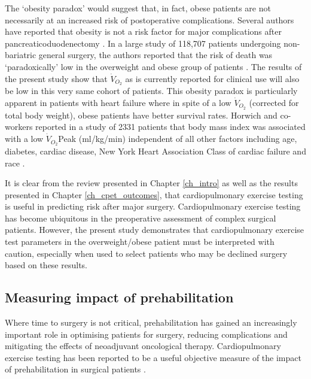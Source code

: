 The `obesity paradox' would suggest that, in fact, obese patients are not necessarily at an increased risk of postoperative complications. Several authors have reported that obesity is not a risk factor for major complications after pancreaticoduodenectomy \parencite{khan_does_2010, tsai_impact_2010, balentine_obesity_2011}. 
In a large study of 118,707 patients undergoing non-bariatric general surgery, the authors reported that the risk of death was `paradoxically' low in the overweight and obese group of patients \parencite{mullen_obesity_2009}. The results of the present study show that $\dot{V}_{O_2}$ as is currently reported for clinical use will also be low in this very same cohort of patients. 
This obesity paradox is particularly apparent in patients with heart failure where in spite of a low $\dot{V}_{O_2}$ (corrected for total body weight), obese patients have better survival rates. Horwich and co-workers reported in a study of 2331 patients that body mass index was associated with a low $\dot{V}_{O_2}$Peak (ml/kg/min) independent of all other factors including age, diabetes, cardiac disease, New York Heart Association Class of cardiac failure and race \parencite{horwich_relationship_2009}.

It is clear from the review presented in Chapter \ref{ch_intro} as well as the results presented in Chapter \ref{ch_cpet_outcomes}, that cardiopulmonary exercise testing is useful in predicting risk after major surgery. Cardiopulmonary exercise testing has become ubiquitous in the preoperative assessment of complex surgical patients. However, the present study demonstrates that cardiopulmonary exercise test parameters in the overweight/obese patient must be interpreted with caution, especially when used to select patients who may be declined surgery based on these results. 

\subsection{Measuring impact of prehabilitation}

Where time to surgery is not critical, prehabilitation has gained an increasingly important role in optimising patients for surgery, reducing complications \parencite{jones_effects_2007, dronkers_preoperative_2010, valkenet_effects_2010, gillis_prehabilitation_2014} and mitigating the effects of neoadjuvant oncological therapy\parencite{west_effect_2015}.
Cardiopulmonary exercise testing has been reported to be a useful objective measure of the impact of prehabilitation in surgical patients \parencite{west_effect_2015}.

